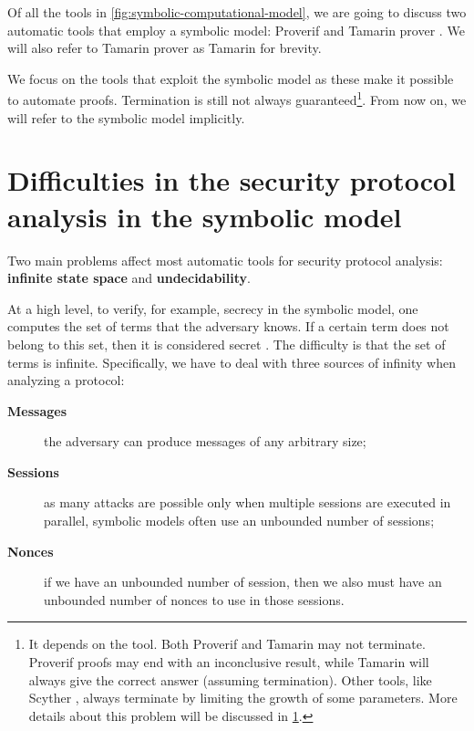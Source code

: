 Of all the tools in \cref{fig:symbolic-computational-model}, we are going to discuss two automatic tools that employ a symbolic model: Proverif \cite{ProverifWebSite} and Tamarin prover \cite{TamarinWebSite}. We will also refer to Tamarin prover as Tamarin for brevity.

We focus on the tools that exploit the symbolic model as these make it possible to automate proofs. Termination is still not always guaranteed\footnote{It depends on the tool. Both Proverif and Tamarin may not terminate. Proverif proofs may end with an inconclusive result, while Tamarin will always give the correct answer (assuming termination). Other tools, like Scyther \cite{Scyther}, always terminate by limiting the growth of some parameters. More details about this problem will be discussed in \cref{sec:difficulties-analysis-symbolic}.}. From now on, we will refer to the symbolic model implicitly.

\section{Difficulties in the security protocol analysis in the symbolic model}
\label{sec:difficulties-analysis-symbolic}
Two main problems affect most automatic tools for security protocol analysis: \textbf{infinite state space} and \textbf{undecidability}.

At a high level, to verify, for example, secrecy in the symbolic model, one computes the set of terms that the adversary knows. If a certain term does not belong to this set, then it is considered secret \cite{SymbolicVerificationBlanchet}. The difficulty is that the set of terms is infinite. Specifically, we have to deal with three sources of infinity when analyzing a protocol:
\begin{description}
    \item[\textbf{Messages}] the adversary can produce messages of any arbitrary size;
    \item[\textbf{Sessions}] as many attacks are possible only when multiple sessions are executed in parallel, symbolic models often use an unbounded number of sessions;
    \item[\textbf{Nonces}] if we have an unbounded number of session, then we also must have an unbounded number of nonces to use in those sessions.
\end{description}

